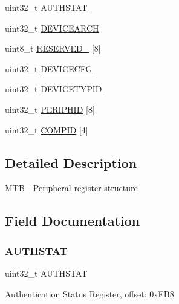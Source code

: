\begin{DoxyCompactItemize}
uint32\+\_\+t \hyperlink{struct_m_t_b___mem_map_a4140c1c606d0e7617563ac4c9fd8c450}{A\+U\+T\+H\+S\+T\+AT}
\item 
uint32\+\_\+t \hyperlink{struct_m_t_b___mem_map_a457881b8a73ea9cece24db6cc5a2481b}{D\+E\+V\+I\+C\+E\+A\+R\+CH}
\item 
uint8\+\_\+t \hyperlink{struct_m_t_b___mem_map_a86684537b595133db57a7bcc73843d2a}{R\+E\+S\+E\+R\+V\+E\+D\+\_} \mbox{[}8\mbox{]}
\item 
uint32\+\_\+t \hyperlink{struct_m_t_b___mem_map_ad35a23bd184366d37228829c33d5bda6}{D\+E\+V\+I\+C\+E\+C\+FG}
\item 
uint32\+\_\+t \hyperlink{struct_m_t_b___mem_map_aa736d6fbfbc7e051f6a2caadd4f17b8f}{D\+E\+V\+I\+C\+E\+T\+Y\+P\+ID}
\item 
uint32\+\_\+t \hyperlink{struct_m_t_b___mem_map_ab6fdc70dd1345592145d79d210ee616d}{P\+E\+R\+I\+P\+H\+ID} \mbox{[}8\mbox{]}
\item 
uint32\+\_\+t \hyperlink{struct_m_t_b___mem_map_a51d2026476b6e1547beb909d07d4aa32}{C\+O\+M\+P\+ID} \mbox{[}4\mbox{]}
\end{DoxyCompactItemize}


\subsection{Detailed Description}
M\+TB -\/ Peripheral register structure 

\subsection{Field Documentation}
\mbox{\label{struct_m_t_b___mem_map_a4140c1c606d0e7617563ac4c9fd8c450}} 
\subsubsection{\texorpdfstring{A\+U\+T\+H\+S\+T\+AT}{AUTHSTAT}}
{\footnotesize\ttfamily uint32\+\_\+t A\+U\+T\+H\+S\+T\+AT}

Authentication Status Register, offset\+: 0x\+F\+B8 \mbox{\label{struct_m_t_b___mem_map_aaa2f8b529d9bf3e3bb5bab8c8b073ead}} 
